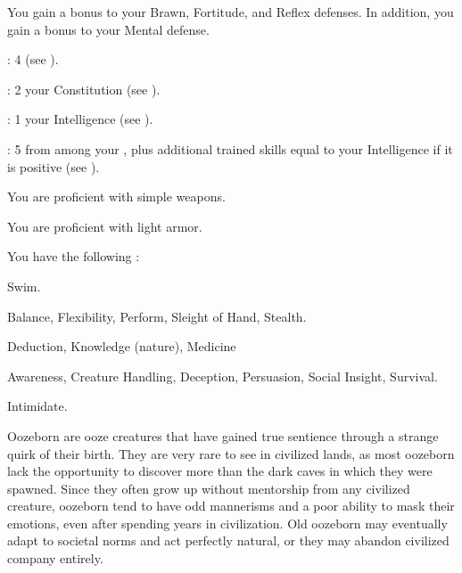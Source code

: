       You gain a  bonus to your Brawn, Fortitude, and Reflex defenses.
      In addition, you gain a  bonus to your Mental defense.

      \begin{raggeditemize}
          \item {}: 4 (see ).
          \item {}: 2 \add your Constitution (see ).
          \item {}: 1 \add your Intelligence (see ).
          \item {}: 5 from among your , plus additional trained skills equal to your Intelligence if it is positive (see ).
      \end{raggeditemize}

      You are proficient with simple weapons.

      You are proficient with light armor.

      You have the following :
      \begin{raggeditemize}
        \item {} Swim.
        \item {} Balance, Flexibility, Perform, Sleight of Hand, Stealth.
        \item {} Deduction, Knowledge (nature), Medicine
        \item {} Awareness, Creature Handling, Deception, Persuasion, Social Insight, Survival.
        \item {} Intimidate.
      \end{raggeditemize}

  Oozeborn are ooze creatures that have gained true sentience through a strange quirk of their birth.
  They are very rare to see in civilized lands, as most oozeborn lack the opportunity to discover more than the dark caves in which they were spawned.
  Since they often grow up without mentorship from any civilized creature, oozeborn tend to have odd mannerisms and a poor ability to mask their emotions, even after spending years in civilization.
  Old oozeborn may eventually adapt to societal norms and act perfectly natural, or they may abandon civilized company entirely.

